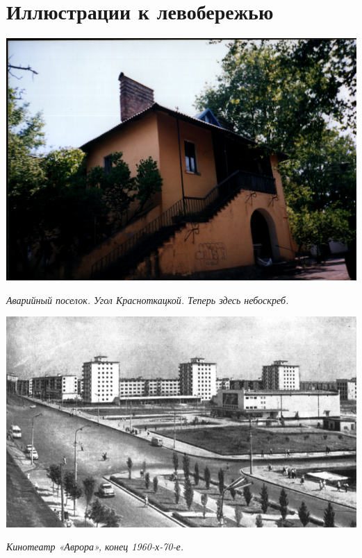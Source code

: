 \chapter*{Иллюстрации к левобережью}


\begin{center}
\includegraphics[width=\linewidth]{lpix/out0002.png}

\textit{Аварийный поселок. Угол Красноткацкой. Теперь здесь небоскреб.}
\end{center}

\newpage


\vspace*{\fill}


\begin{center}
\includegraphics[width=\linewidth]{lpix/avrova-1960x.jpg}

\textit{Кинотеатр «Аврора», конец 1960-х-70-е.}
\end{center}

